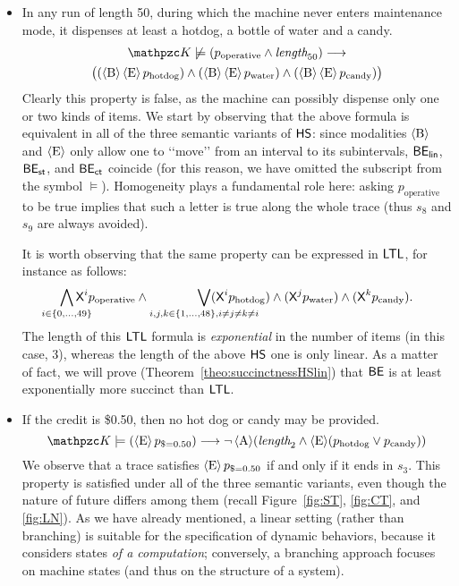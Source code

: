 \begin{itemize}
    \item In any run of length 50, during which the machine never enters maintenance mode, it dispenses at least a hotdog, a bottle of water and a candy. 
    \begin{multline*}
        \Ku\not\models (p_\text{operative} \wedge \Length_{50})\longrightarrow\\ \big((\hsB\hsE p_\text{hotdog}) \wedge  (\hsB\hsE p_\text{water}) \wedge (\hsB\hsE p_\text{candy}) \big)
    \end{multline*}
    Clearly this property is false, as the machine can possibly dispense only one or two kinds of items.
    We start by observing that the above formula is equivalent in all of the three semantic variants of $\text{\sffamily HS}$: since modalities $\operatorname{\langle B\rangle}$ and $\operatorname{\langle E\rangle}$ only allow one to \lq\lq move\rq\rq{} from an interval to its subintervals, $\mathsf{B}\mathsf{E}_{\mathsf{lin}}$, $\mathsf{B}\mathsf{E}_{\mathsf{st}}$, and $\mathsf{B}\mathsf{E}_{\mathsf{ct}}$ coincide (for this reason, we have omitted the subscript from the symbol $\models$). 
    Homogeneity plays a fundamental role here: asking $p_\text{operative}$ to be true implies that such a letter is true along the whole trace (thus $s_8$ and $s_9$ are always avoided).
    
    It is worth observing that the same property can be expressed in $\text{\sffamily LTL}$, for instance as follows:
    \[
    \smashoperator{\bigwedge_{i\in\{0,\ldots,49\}}}\Next^i p_\text{operative} \wedge\smashoperator[r]{\bigvee_{i,j,k\in\{1,\ldots,48\}, i\neq j\neq k\neq i}} (\Next^i p_\text{hotdog}) \wedge (\Next^j p_\text{water}) \wedge (\Next^k p_\text{candy}).
    \]
    The length of this $\text{\sffamily LTL}$ formula is \emph{exponential} in the number of items (in this case, 3), whereas the length of the above $\text{\sffamily HS}$ one is only linear. As a matter of fact, we will prove (Theorem~\ref{theo:succinctnessHSlin}) that $\mathsf{B}\mathsf{E}$ is at least exponentially more succinct than $\text{\sffamily LTL}$.
    
    \item If the credit is \$0.50, then no hot dog or candy may be provided.
    \[
        \Ku\models (\hsE p_\text{\$=0.50})\longrightarrow \neg \hsA (\Length_{2} \wedge \hsE (p_\text{hotdog} \vee p_\text{candy})) 
    \]
    We observe that a trace satisfies $\operatorname{\langle E\rangle} p_\text{\$=0.50}$ if and only if it ends in $s_3$.
    This property is satisfied under all of the three semantic variants, even though the nature of future differs among them (recall Figure~\ref{fig:ST}, \ref{fig:CT}, and \ref{fig:LN}). As we have already mentioned, a linear setting (rather than branching) is suitable for the specification  of dynamic behaviors, because it considers states \emph{of a computation}; conversely, a branching approach focuses on machine states (and thus on the structure of a system).
    

\end{itemize}
